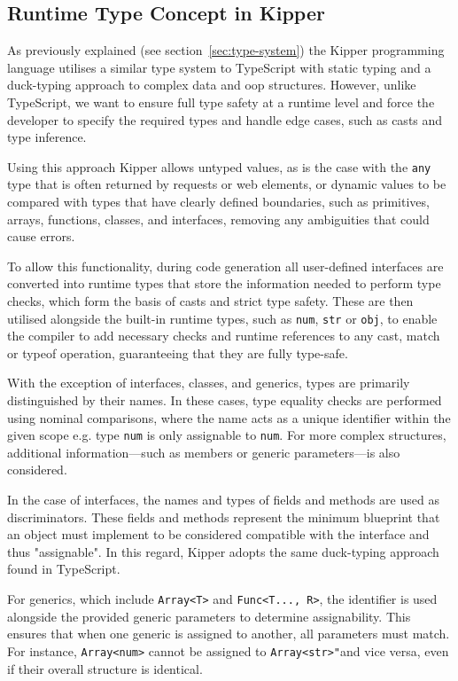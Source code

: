 \subsection{Runtime Type Concept in Kipper}

As previously explained (see section~\ref{sec:type-system}) the Kipper programming language utilises a similar type system to TypeScript with static typing and a duck-typing approach to complex data and \acrshort{oop} structures. However, unlike TypeScript, we want to ensure full type safety at a runtime level and force the developer to specify the required types and handle edge cases, such as casts and type inference.

Using this approach Kipper allows untyped values, as is the case with the \lstinline|any| type that is often returned by requests or web elements, or dynamic values to be compared with types that have clearly defined boundaries, such as primitives, arrays, functions, classes, and interfaces, removing any ambiguities that could cause errors.

To allow this functionality, during code generation all user-defined interfaces are converted into runtime types that store the information needed to perform type checks, which form the basis of casts and strict type safety. These are then utilised alongside the built-in runtime types, such as \lstinline|num|, \lstinline|str| or \lstinline|obj|, to enable the compiler to add necessary checks and runtime references to any cast, match or typeof operation, guaranteeing that they are fully type-safe.

With the exception of interfaces, classes, and generics, types are primarily distinguished by their names. In these cases, type equality checks are performed using nominal comparisons, where the name acts as a unique identifier within the given scope e.g. type \lstinline|num| is only assignable to \lstinline|num|. For more complex structures, additional information—such as members or generic parameters—is also considered.

In the case of interfaces, the names and types of fields and methods are used as discriminators. These fields and methods represent the minimum blueprint that an object must implement to be considered compatible with the interface and thus "assignable". In this regard, Kipper adopts the same duck-typing approach found in TypeScript.

For generics, which include \lstinline|Array<T>| and \lstinline|Func<T..., R>|, the identifier is used alongside the provided generic parameters to determine assignability. This ensures that when one generic is assigned to another, all parameters must match. For instance, \lstinline|Array<num>| cannot be assigned to \lstinline|Array<str>"|and vice versa, even if their overall structure is identical.

